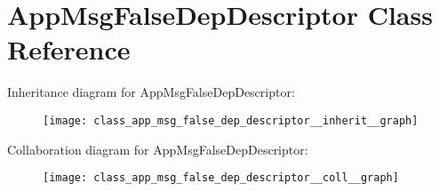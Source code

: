 \hypertarget{class_app_msg_false_dep_descriptor}{}\section{App\+Msg\+False\+Dep\+Descriptor Class Reference}
\label{class_app_msg_false_dep_descriptor}


Inheritance diagram for App\+Msg\+False\+Dep\+Descriptor\+:
\nopagebreak
\begin{figure}[H]
\begin{center}
\leavevmode
\texttt{[image: class\_app\_msg\_false\_dep\_descriptor\_\_inherit\_\_graph]}
\end{center}
\end{figure}


Collaboration diagram for App\+Msg\+False\+Dep\+Descriptor\+:
\nopagebreak
\begin{figure}[H]
\begin{center}
\leavevmode
\texttt{[image: class\_app\_msg\_false\_dep\_descriptor\_\_coll\_\_graph]}
\end{center}
\end{figure}
